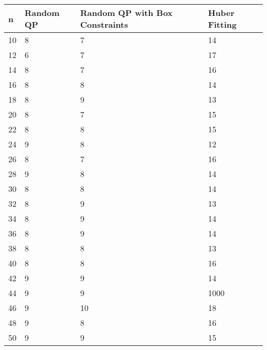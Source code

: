 \begin{tabular}{llll}
n & Random QP & Random QP with Box Constraints & Huber Fitting \\ 
\hline 
10 & 8 & 7 & 14 \\ 
12 & 6 & 7 & 17 \\ 
14 & 8 & 7 & 16 \\ 
16 & 8 & 8 & 14 \\ 
18 & 8 & 9 & 13 \\ 
20 & 8 & 7 & 15 \\ 
22 & 8 & 8 & 15 \\ 
24 & 9 & 8 & 12 \\ 
26 & 8 & 7 & 16 \\ 
28 & 9 & 8 & 14 \\ 
30 & 8 & 8 & 14 \\ 
32 & 8 & 9 & 13 \\ 
34 & 8 & 9 & 14 \\ 
36 & 8 & 9 & 14 \\ 
38 & 8 & 8 & 13 \\ 
40 & 8 & 8 & 16 \\ 
42 & 9 & 9 & 14 \\ 
44 & 9 & 9 & 1000 \\ 
46 & 9 & 10 & 18 \\ 
48 & 9 & 8 & 16 \\ 
50 & 9 & 9 & 15 \\ 
\hline 
\end{tabular}